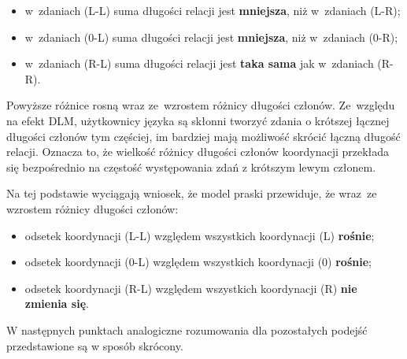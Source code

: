 \begin{itemize}
\item w~zdaniach (L-L) suma długości relacji jest \textbf{mniejsza}, niż w~zdaniach (L-R);
\item w~zdaniach (0-L) suma długości relacji jest \textbf{mniejsza}, niż w~zdaniach (0-R);
\item w~zdaniach (R-L) suma długości relacji jest \textbf{taka sama} jak w~zdaniach (R-R).
\end{itemize}

Powyższe różnice rosną wraz ze~wzrostem różnicy długości członów. Ze~względu na efekt DLM, użytkownicy języka są skłonni tworzyć zdania o krótszej łącznej długości członów tym częściej, im bardziej mają możliwość skrócić łączną długość relacji. Oznacza to, że wielkość różnicy długości członów koordynacji przekłada się bezpośrednio na częstość występowania zdań z krótszym lewym członem.

Na tej podstawie \cite{przepiorkowski2023conjunct} wyciągają wniosek, że model praski przewiduje, że wraz~ze wzrostem różnicy długości członów:
\begin{itemize}
\item odsetek koordynacji (L-L) względem wszystkich koordynacji (L) \textbf{rośnie};
\item odsetek koordynacji (0-L) względem wszystkich koordynacji (0) \textbf{rośnie};
\item odsetek koordynacji (R-L) względem wszystkich koordynacji (R) \textbf{nie zmienia się}.
\end{itemize}

W następnych punktach analogiczne rozumowania dla pozostałych podejść przedstawione są w sposób skrócony.

